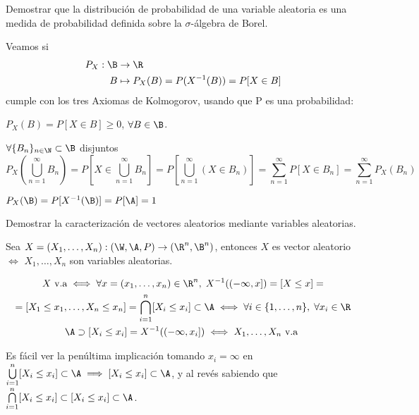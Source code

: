 \begin{ejer}
  Demostrar que la distribución de probabilidad de una variable aleatoria es una medida de probabilidad definida sobre la $\sigma$-álgebra de Borel.
\end{ejer}

\begin{sol}
  Veamos si
  \begin{align*}
    P_X : \B & \to \R \\
    B & \mapsto P_X(B) = P(X^{-1}(B)) = P[X \in B]
  \end{align*}
  cumple con los tres Axiomas de Kolmogorov, usando que P es una probabilidad:

  \begin{nlist}
    \item $P_X(B) = P[X \in B] \geq 0$, $\forall B \in \B$.
    \item $\forall \{B_n\}_{n \in \N} \subset \B$ disjuntos $$ P_X(\bigcup \limits^\infty_{n = 1} B_n) = P[X \in \bigcup \limits^\infty_{n = 1} B_n] = P[\bigcup \limits^\infty_{n = 1} (X \in B_n)] = \sum \limits^\infty_{n = 1} P[X \in B_n] = \sum \limits^\infty_{n = 1} P_X(B_n)$$
    \item $P_X(\B) = P[X^{-1}(\B)] = P[\A] = 1$
  \end{nlist}
\end{sol}

\begin{ejer}
  Demostrar la caracterización de vectores aleatorios mediante variables aleatorias.
\end{ejer}

\begin{sol}
  Sea $X = (X_1, \ldots, X_n) : (\W, \A, P) \to (\R^n, \B^n)$, entonces $X$ es vector aleatorio $\iff$ $X_1, \ldots, X_n$ son variables aleatorias.

  \begin{multline*}
    X \text{ v.a} \iff \forall x = (x_1, \ldots, x_n) \in \R^n, \; X^{-1}((-\infty, x]) = [X \leq x] = \\ =  [X_1 \leq x_1, \ldots, X_n \leq x_n] = \bigcap \limits^n_{i = 1} [X_i \leq x_i] \subset \A \iff \forall i \in \{1, \ldots, n\}, \; \forall x_i \in \R \\ \A \supset [X_i \leq x_i] = X^{-1}((-\infty, x_i]) \iff X_1, \ldots, X_n \text{ v.a }
  \end{multline*}

  Es fácil ver la penúltima implicación tomando $x_i = \infty$ en $\bigcup \limits^n_{i = 1} [X_i \leq x_i] \subset \A \implies [X_i \leq x_i] \subset \A$, y al revés sabiendo que $\bigcap \limits^n_{i = 1} [X_i \leq x_i] \subset [X_i \leq x_i] \subset \A$.
\end{sol}

